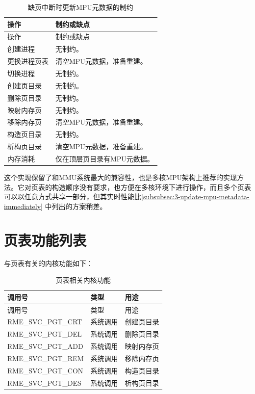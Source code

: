 \begin{xltabular}{\textwidth}{@{}>{\hsize\raggedright\arraybackslash}X>{\hsize\raggedright\arraybackslash}X@{}}
\caption{缺页中断时更新MPU元数据的制约}\label{tab:3-7-page-fault-mpu-metadata-update-constraints}\\
\toprule
操作 & 制约或缺点\tabularnewline
\endfirsthead
\toprule
操作 & 制约或缺点\tabularnewline
\midrule
\endhead
\bottomrule
\endlastfoot
创建进程 & 无制约。\tabularnewline
更换进程页表 & 清空MPU元数据，准备重建。\tabularnewline
切换进程 & 无制约。\tabularnewline
创建页目录 & 无制约。\tabularnewline
删除页目录 & 无制约。\tabularnewline
映射内存页 & 无制约。\tabularnewline
移除内存页 & 清空MPU元数据，准备重建。\tabularnewline
构造页目录 & 无制约。\tabularnewline
析构页目录 & 清空MPU元数据，准备重建。\tabularnewline
内存消耗 & 仅在顶层页目录有MPU元数据。\tabularnewline
\end{xltabular}

这个实现保留了和MMU系统最大的兼容性，也是多核MPU架构上推荐的实现方法。它对页表的构造顺序没有要求，也方便在多核环境下进行操作，而且多个页表可以以任意方式共享一部分，但其实时性能比\ref{subsubsec:3-update-mpu-metadata-immediately}
中列出的方案稍差。

\section{页表功能列表}\label{sec:3-page-table-function-list}
\nopagebreak[4]

与页表有关的内核功能如下：

\begin{xltabular}{\textwidth}{@{}>{\hsize\raggedright\arraybackslash}X>{\hsize\raggedright\arraybackslash}X>{\hsize\raggedright\arraybackslash}X@{}}
\caption{页表相关内核功能}\label{tab:3-8-page-table-related-kernel-functions}\\
\toprule
调用号 & 类型 & 用途\tabularnewline
\endfirsthead
\toprule
调用号 & 类型 & 用途\tabularnewline
\midrule
\endhead
\bottomrule
\endlastfoot
RME\_SVC\_PGT\_CRT & 系统调用 & 创建页目录\tabularnewline
RME\_SVC\_PGT\_DEL & 系统调用 & 删除页目录\tabularnewline
RME\_SVC\_PGT\_ADD & 系统调用 & 映射内存页\tabularnewline
RME\_SVC\_PGT\_REM & 系统调用 & 移除内存页\tabularnewline
RME\_SVC\_PGT\_CON & 系统调用 & 构造页目录\tabularnewline
RME\_SVC\_PGT\_DES & 系统调用 & 析构页目录\tabularnewline
\end{xltabular}

